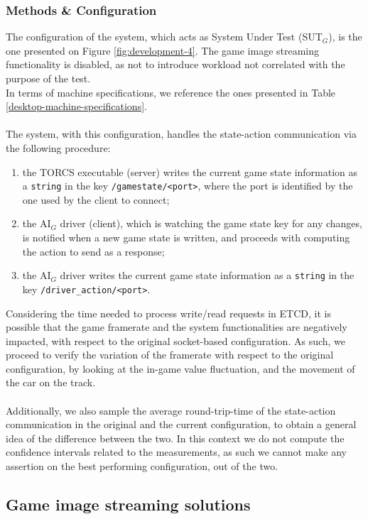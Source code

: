 \subsubsection{Methods \& Configuration}
The configuration of the system, which acts as System Under Test (SUT$_G$), is the one presented on Figure \ref{fig:development-4}. The game image streaming functionality is disabled, as not to introduce workload not correlated with the purpose of the test. \\
In terms of machine specifications, we reference the ones presented in Table \ref{desktop-machine-specifications}. \\ \\
The system, with this configuration, handles the state-action communication via the following procedure:
\begin{enumerate}
	\item the TORCS executable (server) writes the current game state information as a \texttt{string} in the key \texttt{/gamestate/<port>}, where the port is identified by the one used by the client to connect;
	\item the AI$_G$ driver (client), which is watching the game state key for any changes, is notified when a new game state is written, and proceeds with computing the action to send as a response;
	\item the AI$_G$ driver writes the current game state information as a \texttt{string} in the key \texttt{/driver\_action/<port>}.
\end{enumerate}
Considering the time needed to process write/read requests in ETCD, it is possible that the game framerate and the system functionalities are negatively impacted, with respect to the original socket-based configuration. As such, we proceed to verify the variation of the framerate with respect to the original configuration, by looking at the in-game value fluctuation, and the movement of the car on the track. \\ \\
Additionally, we also sample the average round-trip-time of the state-action communication in the original and the current configuration, to obtain a general idea of the difference between the two. In this context we do not compute the confidence intervals related to the measurements, as such we cannot make any assertion on the best performing configuration, out of the two.

\subsection{Game image streaming solutions}

